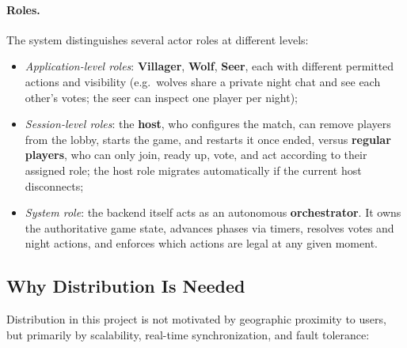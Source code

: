 \documentclass{scrartcl}
\begin{document}
\paragraph{Roles.}
The system distinguishes several actor roles at different levels:
\begin{itemize}
      \item \emph{Application-level roles}: \textbf{Villager}, \textbf{Wolf},
            \textbf{Seer}, each with different permitted actions and visibility (e.g.\
            wolves share a private night chat and see each other's votes; the seer can
            inspect one player per night);
      \item \emph{Session-level roles}: the \textbf{host}, who configures the
            match, can remove players from the lobby, starts the game, and restarts it
            once ended, versus \textbf{regular players}, who can only join, ready up,
            vote, and act according to their assigned role; the host role migrates
            automatically if the current host disconnects;
      \item \emph{System role}: the backend itself acts as an autonomous
            \textbf{orchestrator}. It owns the authoritative game state, advances phases
            via timers, resolves votes and night actions, and enforces which actions are
            legal at any given moment.
\end{itemize}

\subsection{Why Distribution Is Needed}\label{why-distribution}

Distribution in this project is not motivated by geographic proximity to users,
but primarily by scalability, real-time synchronization, and fault tolerance:
\end{document}
